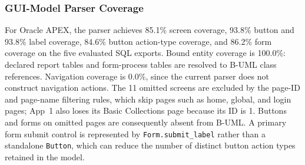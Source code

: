 \subsubsection{GUI-Model Parser Coverage}
\label{subsubsec:parser-gui-results}

For Oracle APEX, the parser achieves 85.1\% screen coverage, 93.8\% button and 93.8\% label coverage, 84.6\% button action-type coverage, and 86.2\% form coverage on the five evaluated SQL exports. Bound entity coverage is 100.0\%: declared report tables and form-process tables are resolved to B-UML class references. Navigation coverage is 0.0\%, since the current parser does not construct navigation actions. The 11 omitted screens are excluded by the page-ID and page-name filtering rules, which skip pages such as home, global, and login pages; App~1 also loses its Basic Collections page because its ID is 1. Buttons and forms on omitted pages are consequently absent from B-UML. A primary form submit control is represented by \texttt{Form.submit\_label} rather than a standalone \texttt{Button}, which can reduce the number of distinct button action types retained in the model.


